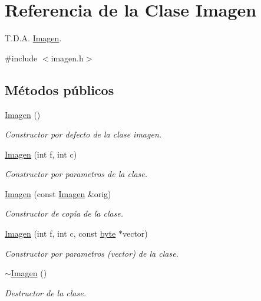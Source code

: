 \hypertarget{classImagen}{}\section{Referencia de la Clase Imagen}
\label{classImagen}


T.\+D.\+A. \hyperlink{classImagen}{Imagen}.  




{\ttfamily \#include $<$imagen.\+h$>$}

\subsection*{Métodos públicos}
\begin{DoxyCompactItemize}
\item 
\hyperlink{classImagen_ab2e649aa7a105155c7bfdb846abf0528}{Imagen} ()
\begin{DoxyCompactList}\small\item\em Constructor por defecto de la clase imagen. \end{DoxyCompactList}\item 
\hyperlink{classImagen_a4b397c4a3dc0794cab351f96dc9390fd}{Imagen} (int f, int c)
\begin{DoxyCompactList}\small\item\em Constructor por parametros de la clase. \end{DoxyCompactList}\item 
\hyperlink{classImagen_a987062737ac7faacc522370dbae3b224}{Imagen} (const \hyperlink{classImagen}{Imagen} \&orig)
\begin{DoxyCompactList}\small\item\em Constructor de copia de la clase. \end{DoxyCompactList}\item 
\hyperlink{classImagen_a33a2993487ba11088d66acc31bb02ce3}{Imagen} (int f, int c, const \hyperlink{imagen_8h_a0c8186d9b9b7880309c27230bbb5e69d}{byte} $\ast$vector)
\begin{DoxyCompactList}\small\item\em Constructor por parametros (vector) de la clase. \end{DoxyCompactList}\item 
\hyperlink{classImagen_a03dd93c9cf920a9dc0b72f8bd34f2e8a}{$\sim$\+Imagen} ()
\begin{DoxyCompactList}\small\item\em Destructor de la clase. \end{DoxyCompactList}\item 

\end{DoxyCompactItemize}
